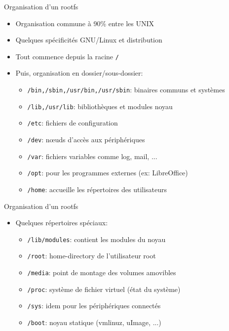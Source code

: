 \begin{frame}{Organisation d'un rootfs}
  \begin{itemize}
  \item Organisation commune à 90\% entre les UNIX
  \item Quelques spécificités GNU/Linux et distribution
  \item Tout commence depuis la racine \texttt{/}
  \item Puis, organisation en dossier/sous-dossier:
    \begin{itemize}
    \item \texttt{/bin,/sbin,/usr/bin,/usr/sbin}: binaires communs et systèmes
    \item \texttt{/lib,/usr/lib}: bibliothèques et modules noyau
    \item \texttt{/etc}: fichiers de configuration
    \item \texttt{/dev}: nœuds d'accès aux périphériques
    \item \texttt{/var}: fichiers variables comme log, mail, ...
    \item \texttt{/opt}: pour les programmes externes (ex: LibreOffice)
    \item \texttt{/home}: accueille les répertoires des utilisateurs
    \end{itemize}
  \end{itemize}
\end{frame}

\begin{frame}{Organisation d'un rootfs}
  \begin{itemize}
  \item Quelques répertoires spéciaux:
    \begin{itemize}
    \item \texttt{/lib/modules}: contient les modules du noyau
    \item \texttt{/root}: home-directory de l'utilisateur root
    \item \texttt{/media}: point de montage des volumes amovibles
    \item \texttt{/proc}: système de fichier virtuel (état du système)
    \item \texttt{/sys}: idem pour les périphériques connectés
    \item \texttt{/boot}: noyau statique (vmlinuz, uImage, ...)
    \end{itemize}
  \end{itemize}
\end{frame}

